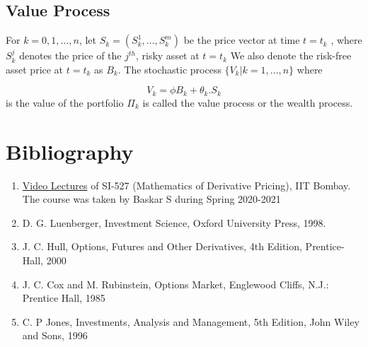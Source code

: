 \documentclass{report}
\begin{document}
\subsection{Value Process}
For $k = 0, 1, \dots, n$, let $S_k = (S_k^1, \dots, S_k^m)$ be the price vector at time $t = t_k$ , where $S_k^j$ denotes the price of the $j^{th}$, risky asset at $t=t_k$ We also denote the risk-free asset price at $t = t_k$ as $B_k$. The stochastic process $\{V_k | k = 1, \dots, n\}$ where

\begin{equation}
    V_k = \phi B_k + \theta_k.S_k
\end{equation}
is the value of the portfolio $\Pi_k$ is called the value process or the wealth process.







\clearpage
\section*{Bibliography}
\begin{enumerate}
    \item \href{https://www.youtube.com/playlist?list=PLjAj1Z92T7LTcyjV-Di2_a4mij9_5fKkM}{Video Lectures} of SI-527 (Mathematics of Derivative Pricing), IIT Bombay. The course was taken by Baskar S during Spring 2020-2021
    \item D. G. Luenberger, Investment Science, Oxford University Press, 1998.
    \item J. C. Hull, Options, Futures and Other Derivatives, 4th Edition, Prentice-Hall, 2000
    \item J. C. Cox and M. Rubinstein, Options Market, Englewood Cliffs, N.J.: Prentice Hall, 1985
    \item C. P Jones, Investments, Analysis and Management, 5th Edition, John Wiley and Sons, 1996
\end{enumerate}
\end{document}
